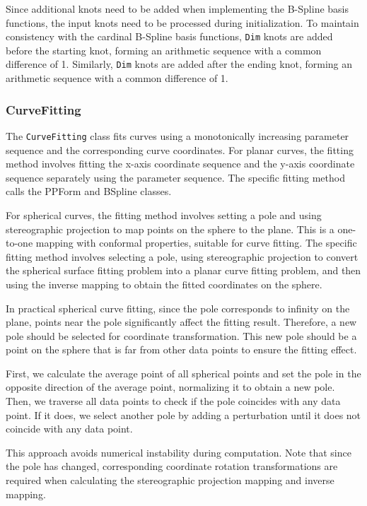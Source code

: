 \documentclass[a4paper]{article}
\begin{document}
\begin{sloppypar}
Since additional knots need to be added when implementing the B-Spline basis
functions, the input knots need to be processed during initialization. To
maintain consistency with the cardinal B-Spline basis functions, \verb|Dim|
knots are added before the starting knot, forming an arithmetic sequence with a
common difference of 1. Similarly, \verb|Dim| knots are added after the ending
knot, forming an arithmetic sequence with a common difference of 1.

\subsubsection{CurveFitting}
The \verb|CurveFitting| class fits curves using a monotonically increasing
parameter sequence and the corresponding curve coordinates. For planar curves,
the fitting method involves fitting the x-axis coordinate sequence and the
y-axis coordinate sequence separately using the parameter sequence. The
specific fitting method calls the PPForm and BSpline classes.

For spherical curves, the fitting method involves setting a pole and using
stereographic projection to map points on the sphere to the plane. This is a
one-to-one mapping with conformal properties, suitable for curve fitting. The
specific fitting method involves selecting a pole, using stereographic
projection to convert the spherical surface fitting problem into a planar curve
fitting problem, and then using the inverse mapping to obtain the fitted
coordinates on the sphere.

In practical spherical curve fitting, since the pole corresponds to infinity on
the plane, points near the pole significantly affect the fitting result.
Therefore, a new pole should be selected for coordinate transformation. This
new pole should be a point on the sphere that is far from other data points to
ensure the fitting effect.

First, we calculate the average point of all spherical points and set the pole
in the opposite direction of the average point, normalizing it to obtain a new
pole. Then, we traverse all data points to check if the pole coincides with any
data point. If it does, we select another pole by adding a perturbation until
it does not coincide with any data point.

This approach avoids numerical instability during computation. Note that since
the pole has changed, corresponding coordinate rotation transformations are
required when calculating the stereographic projection mapping and inverse
mapping.


\end{sloppypar}
\end{document}
